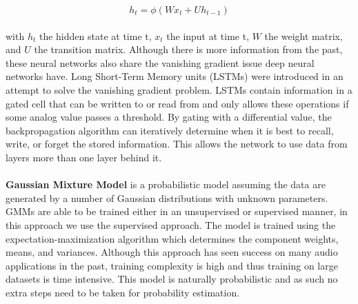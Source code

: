\begin{equation}
    h_t=\phi(Wx_t+Uh_{t-1})
\end{equation}
\\
with $h_t$ the hidden state at time t, $x_t$ the input at time t, $W$ the weight matrix, and $U$ the transition matrix. Although there is more information from the past, these neural networks also share the vanishing gradient issue deep neural networks have. Long Short-Term Memory units (LSTMs) were introduced in an attempt to solve the vanishing gradient problem. LSTMs contain information in a gated cell that can be written to or read from and only allows these operations if some analog value passes a threshold. By gating with a differential value, the backpropagation algorithm can iteratively determine when it is best to recall, write, or forget the stored information. This allows the network to use data from layers more than one layer behind it.
\\
\\
\textbf{Gaussian Mixture Model} is a probabilistic model assuming the data are generated by a number of Gaussian distributions with unknown parameters. GMMs are able to be trained either in an unsupervised or supervised manner, in this approach we use the supervised approach. The model is trained using the expectation-maximization algorithm which determines the component weights, means, and variances. Although this approach has seen success on many audio applications in the past, training complexity is high and thus training on large datasets is time intensive. This model is naturally probabilistic and as such no extra steps need to be taken for probability estimation.
\\
